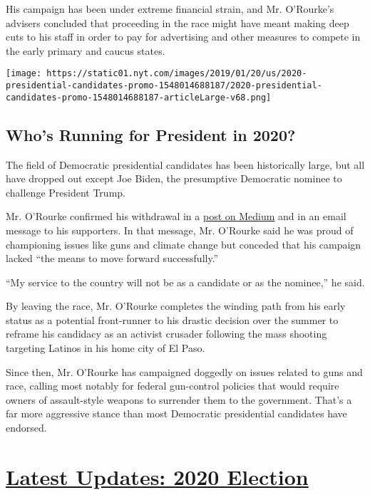 His campaign has been under extreme financial strain, and Mr. O'Rourke's
advisers concluded that proceeding in the race might have meant making
deep cuts to his staff in order to pay for advertising and other
measures to compete in the early primary and caucus states.

\href{https://www.nytimes.com/interactive/2019/us/politics/2020-presidential-candidates.html}{}

\texttt{[image: https://static01.nyt.com/images/2019/01/20/us/2020-presidential-candidates-promo-1548014688187/2020-presidential-candidates-promo-1548014688187-articleLarge-v68.png]}

\hypertarget{whos-running-for-president-in-2020}{%
\subsection{Who's Running for President in
2020?}\label{whos-running-for-president-in-2020}}

The field of Democratic presidential candidates has been historically
large, but all have dropped out except Joe Biden, the presumptive
Democratic nominee to challenge President Trump.

Mr. O'Rourke confirmed his withdrawal in a
\href{https://medium.com/@BetoORourke/thank-you-b13458279468}{post on
Medium} and in an email message to his supporters. In that message, Mr.
O'Rourke said he was proud of championing issues like guns and climate
change but conceded that his campaign lacked ``the means to move forward
successfully.''

``My service to the country will not be as a candidate or as the
nominee,'' he said.

By leaving the race, Mr. O'Rourke completes the winding path from his
early status as a potential front-runner to his drastic decision over
the summer to reframe his candidacy as an activist crusader following
the mass shooting targeting Latinos in his home city of El Paso.

Since then, Mr. O'Rourke has campaigned doggedly on issues related to
guns and race, calling most notably for federal gun-control policies
that would require owners of assault-style weapons to surrender them to
the government. That's a far more aggressive stance than most Democratic
presidential candidates have endorsed.

\hypertarget{latest-updates-2020-election}{%
\section{\texorpdfstring{\href{https://www.nytimes.com/2020/07/31/us/elections/biden-vs-trump.html?action=click\&pgtype=Article\&state=default\&region=MAIN_CONTENT_1\&context=storylines_live_updates}{Latest
Updates: 2020
Election}}{Latest Updates: 2020 Election}}\label{latest-updates-2020-election}}


